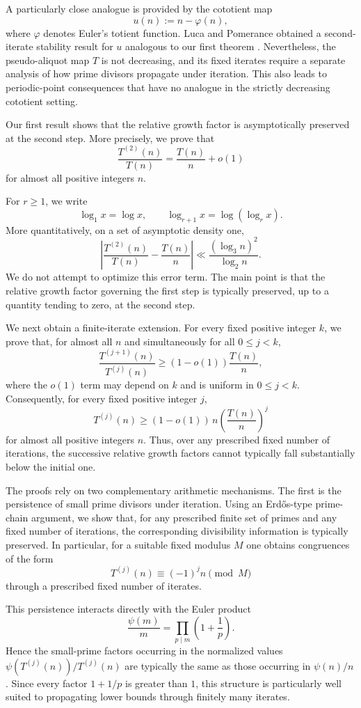 \documentclass{article}
\begin{document}
A particularly close analogue is provided by the cototient map
\[
u(n):=n-\varphi(n),
\]
where $\varphi$ denotes Euler's totient function. Luca and Pomerance
obtained a second-iterate stability result for $u$ analogous to our
first theorem \cite{ref8}. Nevertheless, the pseudo-aliquot map $T$
is not decreasing, and its fixed iterates require a separate analysis
of how prime divisors propagate under iteration. This also leads to
periodic-point consequences that have no analogue in the strictly
decreasing cototient setting.


Our first result shows that the relative growth factor is
asymptotically preserved at the second step. More precisely, we prove
that
\[
\frac{T^{(2)}(n)}{T(n)}
=
\frac{T(n)}{n}+o(1)
\]
for almost all positive integers $n$.

For $r\ge1$, we write
\[
\log_1x=\log x,
\qquad
\log_{r+1}x=\log(\log_r x).
\]
More quantitatively, on a set of asymptotic density one,
\[
\left|
\frac{T^{(2)}(n)}{T(n)}
-
\frac{T(n)}{n}
\right|
\ll
\frac{(\log_3n)^2}{\log_2n}.
\]
We do not attempt to optimize this error term. The main point is that
the relative growth factor governing the first step is typically
preserved, up to a quantity tending to zero, at the second step.

We next obtain a finite-iterate extension. For every fixed positive
integer $k$, we prove that, for almost all $n$ and simultaneously for
all $0\le j<k$,
\[
\frac{T^{(j+1)}(n)}{T^{(j)}(n)}
\ge
(1-o(1))\frac{T(n)}{n},
\]
where the $o(1)$ term may depend on $k$ and is uniform in
$0\le j<k$. Consequently, for every fixed positive integer $j$,
\[
T^{(j)}(n)
\ge
(1-o(1))\,n
\left(\frac{T(n)}{n}\right)^j
\]
for almost all positive integers $n$. Thus, over any prescribed fixed
number of iterations, the successive relative growth factors cannot
typically fall substantially below the initial one.

The proofs rely on two complementary arithmetic mechanisms. The first
is the persistence of small prime divisors under iteration. Using an
Erd\H{o}s-type prime-chain argument, we show that, for any prescribed
finite set of primes and any fixed number of iterations, the
corresponding divisibility information is typically preserved. In
particular, for a suitable fixed modulus $M$ one obtains congruences
of the form
\[
T^{(j)}(n)
\equiv
(-1)^jn
\pmod M
\]
through a prescribed fixed number of iterates.

This persistence interacts directly with the Euler product
\[
\frac{\psi(m)}m
=
\prod_{p\mid m}\left(1+\frac1p\right).
\]
Hence the small-prime factors occurring in the normalized values
$\psi(T^{(j)}(n))/T^{(j)}(n)$ are typically the same as those
occurring in $\psi(n)/n$. Since every factor $1+1/p$ is greater
than $1$, this structure is particularly well suited to propagating
lower bounds through finitely many iterates.
\end{document}
